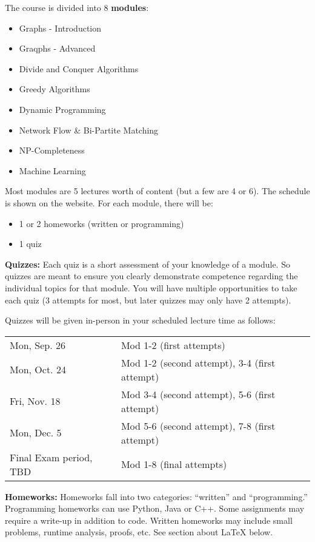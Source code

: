 \documentclass[12pt]{article}
\begin{document}
The course is divided into 8 {\bf modules}:
\begin{itemize}
    \item Graphs - Introduction
    \item Graqphs - Advanced
    \item Divide and Conquer Algorithms
    \item Greedy Algorithms
    \item Dynamic Programming
    \item Network Flow \& Bi-Partite Matching
    \item NP-Completeness
    \item Machine Learning
\end{itemize}
Most modules are 5 lectures worth of content (but a few are 4 or 6). The schedule is shown on the website. 
For each module, there will be:
\begin{itemize}
    \item 1 or 2 homeworks (written or programming)
    \item 1 quiz
\end{itemize}

\textbf{Quizzes:}  Each quiz is a short assessment of your knowledge of a module. So quizzes are meant to ensure you clearly demonstrate competence regarding the individual topics for that module.  You will have multiple opportunities to take each quiz (3 attempts for most, but later quizzes may only have 2 attempts).

Quizzes will be given in-person in your scheduled lecture time as follows:\\
\begin{tabular}{ll}
Mon, Sep. 26	&	Mod 1-2 (first attempts) \\
Mon, Oct. 24	&	Mod 1-2 (second attempt), 3-4 (first attempt) \\
Fri, Nov. 18	&	Mod 3-4 (second attempt), 5-6 (first attempt) \\
Mon, Dec. 5	    &	Mod 5-6 (second attempt), 7-8 (first attempt) \\
Final Exam period, TBD 	&	Mod 1-8 (final attempts) \\
\end{tabular}

\textbf{Homeworks:} Homeworks fall into two categories:  ``written'' and ``programming.'' Programming homeworks can use Python, Java or C++. Some assignments may require a write-up in addition to code.  Written homeworks may include small problems, runtime analysis, proofs, etc.   See section about \LaTeX{} below.
\end{document}
